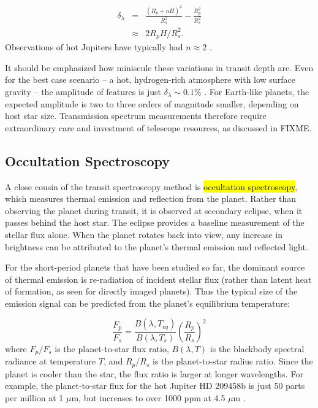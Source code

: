 \documentclass[graybox,natbib,nosecnum]{svmult}
\newcommand{\hbindex}[1]{\hl{#1}\index{#1}}  %
\begin{document}
\begin{eqnarray}
\delta_\lambda &=& \frac{(R_p + nH)^2}{R_s^2} - \frac{R_p^2}{R_s^2}\\
 & \approx & 2R_pH/R_s^2.
\end{eqnarray} 
Observations of hot Jupiters have typically had $n\approx2$ \citep{stevenson16}. 

It should be emphasized how miniscule these variations in transit depth are. Even for the best case scenario -- a hot, hydrogen-rich atmosphere with low surface gravity -- the amplitude of features is just $\delta_\lambda \sim0.1\%$ \citep[e.g. WASP 121-b;][]{evans16}. For Earth-like planets, the expected amplitude is two to three orders of magnitude smaller, depending on host star size. Transmission spectrum measurements therefore require extraordinary care and investment of telescope resources, as discussed in FIXME.

\subsection{Occultation Spectroscopy}
A close cousin of the transit spectroscopy method is \hbindex{occultation spectroscopy}, which measures thermal emission and reflection from the planet. Rather than observing the planet during transit, it is observed at secondary eclipse, when it passes behind the host star. The eclipse provides a baseline measurement of the stellar flux alone. When the planet rotates back into view, any increase in brightness can be attributed to the planet's thermal emission and reflected light.

For the short-period planets that have been studied so far, the dominant source of thermal emission is re-radiation of incident stellar flux (rather than latent heat of formation, as seen for directly imaged planets). Thus the typical size of the emission signal can be predicted from the planet's equilibrium temperature:

\begin{equation}
\label{eqn:fpfs}
\frac{F_p}{F_s} = \frac{B(\lambda, T_{eq})}{B(\lambda, T_s)}\left(\frac{R_p}{R_s}\right)^2
\end{equation}
where $F_p/F_s$ is the planet-to-star flux ratio, $B(\lambda, T)$ is the blackbody spectral radiance at temperature $T$, and $R_p/R_s$ is the planet-to-star radius ratio. Since the planet is cooler than the star, the flux ratio is larger at longer wavelengths. For example, the planet-to-star flux for the hot Jupiter HD 209458b is just 50 parts per million at 1 $\mu$m, but increases to over 1000 ppm at 4.5 $\mu$m \citep{line16}.
\end{document}
